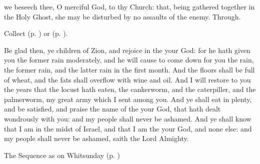 \vspace{-0.25\baselineskip}

\collect
{} we beseech thee, O merciful God, to thy Church: that, being gathered together in the Holy Ghost, she may be disturbed by no assaults of the enemy. Through.
\begin{rubric}
     Collect  (p. \pageref{SPAgainst}) or  (p. \pageref{SPChiefBishop}).
\end{rubric}

\vspace{-0.25\baselineskip}

 Be glad then, ye children of Zion, and rejoice in the  your God: for he hath given you the former rain moderately, and he will cause to come down for you the rain, the former rain, and the latter rain in the first month. And the floors shall be full of wheat, and the fats shall overflow with wine and oil. And I will restore to you the years that the locust hath eaten, the cankerworm, and the caterpiller, and the palmerworm, my great army which I sent among you. And ye shall eat in plenty, and be satisfied, and praise the name of the  your God, that hath dealt wondrously with you: and my people shall never be ashamed. And ye shall know that I am in the midst of Israel, and that I am the  your God, and none else: and my people shall never be ashamed, saith the Lord Almighty.

\begin{rubric}
{The Sequence as on Whitsunday (p. \pageref{WhitSeq})}
\end{rubric}

\vspace{-0.25\baselineskip}


